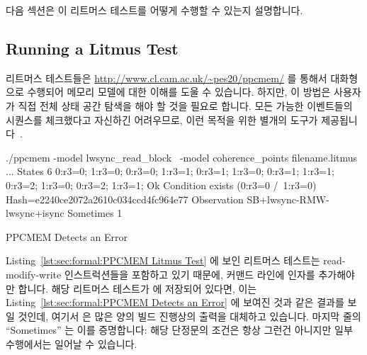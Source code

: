 다음 섹션은 이 리트머스 테스트를 어떻게 수행할 수 있는지 설명합니다.
\iffalse

Putting all this together, the C-language equivalent to the entire litmus
test is as shown in
Listing~\ref{lst:sec:formal:Meaning of PPCMEM Litmus Test}.
The key point is that if \co{atomic_add_return()} acts as a full
memory barrier (as the Linux kernel requires it to), 
then it should be impossible for \co{P0()}'s and \co{P1()}'s \co{r3}
variables to both be zero after execution completes.

The next section describes how to run this litmus test.
\fi

\subsection{Running a Litmus Test}
\label{sec:formal:Running a Litmus Test}

리트머스 테스트들은
\url{http://www.cl.cam.ac.uk/~pes20/ppcmem/} 를 통해서 대화형으로 수행되어
메모리 모델에 대한 이해를 도울 수 있습니다.
하지만, 이 방법은 사용자가 직접 전체 상태 공간 탐색을 해야 할 것을 필요로
합니다.
모든 가능한 이벤트들의 시퀀스를 체크했다고 자신하긴 어려우므로, 이런 목적을
위한 별개의 도구가 제공됩니다~\cite{PaulEMcKenney2011ppcmem}.
\iffalse

Litmus tests may be run interactively via
\url{http://www.cl.cam.ac.uk/~pes20/ppcmem/}, which can help build an
understanding of the memory model.
However, this approach requires that the user manually carry out the
full state-space search.
Because it is very difficult to be sure that you have checked every
possible sequence of events, a separate tool is provided for this
purpose~\cite{PaulEMcKenney2011ppcmem}.
\fi

\begin{listing}[tbp]
{ \scriptsize
\begin{verbbox}
./ppcmem -model lwsync_read_block \
         -model coherence_points filename.litmus
...
States 6
0:r3=0; 1:r3=0;
0:r3=0; 1:r3=1;
0:r3=1; 1:r3=0;
0:r3=1; 1:r3=1;
0:r3=2; 1:r3=0;
0:r3=2; 1:r3=1;
Ok
Condition exists (0:r3=0 /\ 1:r3=0)
Hash=e2240ce2072a2610c034ccd4fc964e77
Observation SB+lwsync-RMW-lwsync+isync Sometimes 1
\end{verbbox}
}
\centering
\theverbbox
\caption{PPCMEM Detects an Error}
\label{lst:sec:formal:PPCMEM Detects an Error}
\end{listing}

Listing~\ref{lst:sec:formal:PPCMEM Litmus Test}
에 보인 리트머스 테스트는 read-modify-write 인스트럭션들을 포함하고 있기
때문에, 커맨드 라인에  인자를 추가해야만 합니다.
해당 리트머스 테스트가  에 저장되어 있다면, 이는
Listing~\ref{lst:sec:formal:PPCMEM Detects an Error} 에 보여진 것과 같은 결과를
보일 것인데, 여기서 \co{...} 은 많은 양의 빌드 진행상의 출력을 대체하고
있습니다.
마지막 줄의 ``Sometimes'' 는 이를 증명합니다: 해당 단정문의 조건은 항상 그런건
아니지만 일부 수행에서는 일어날 수 있습니다.
\iffalse

